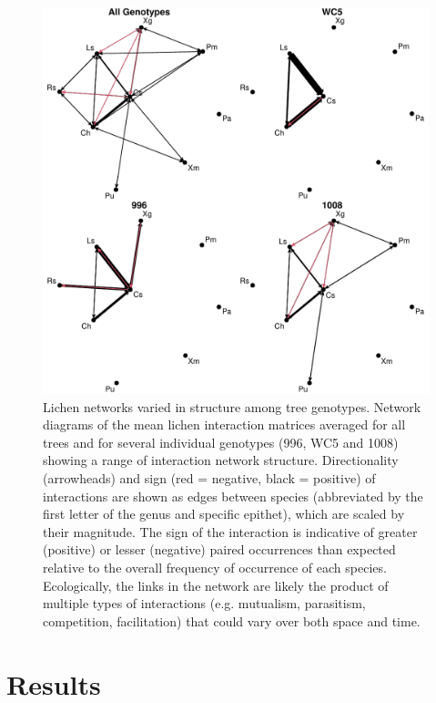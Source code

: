 \documentclass[11pt,twocolumn,twoside,lineno]{pnas-new}
\begin{document}
{\begin{figure}[ht]
\centering
\includegraphics[width=\linewidth]{cn_onc.pdf}
\caption{Lichen networks varied in structure among tree
  genotypes. Network diagrams of the mean lichen interaction matrices
  averaged for all trees and for several individual genotypes (996,
  WC5 and 1008) showing a range of interaction network
  structure. Directionality (arrowheads) and sign (red = negative,
  black = positive) of interactions are shown as edges between species
  (abbreviated by the first letter of the genus and specific epithet),
  which are scaled by their magnitude. The sign of the interaction is
  indicative of greater (positive) or lesser (negative) paired
  occurrences than expected relative to the overall frequency of
  occurrence of each species. Ecologically, the links in the network
  are likely the product of multiple types of interactions
  (e.g. mutualism, parasitism, competition, facilitation) that could
  vary over both space and time.}
\label{fig:geno_nets}
\end{figure}
}

\showmatmethods{} %

\section*{Results}
\end{document}
